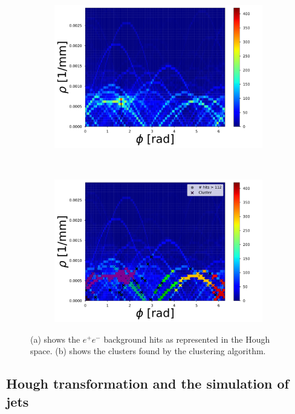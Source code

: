 \begin{figure}[ht]
	\centering
	\begin{subfigure}[b]{0.48\textwidth}
        \includegraphics[width=\textwidth]{figures/HT_background.pdf}
        \caption{}

    \end{subfigure}
		~ %
		\begin{subfigure}[b]{0.48\textwidth}
					\includegraphics[width=\textwidth]{figures/HT_background_maxima.pdf}
					\caption{}
			\end{subfigure}
	\label{fig_bcg_HT}
	\caption{(a) shows the $e^+e^-$ background hits as represented in the Hough space. (b) shows the clusters found by the clustering algorithm.}
\end{figure}


\subsection{Hough transformation and the simulation of jets}

